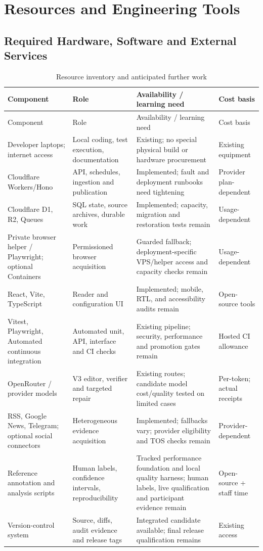 \chapter{Resources and Engineering Tools}\label{app:resources}
\section{Required Hardware, Software and External Services}
\begin{longtable}{L{3.35cm}L{3cm}L{3.7cm}L{2.25cm}}
\caption{Resource inventory and anticipated further work}\label{tab:resources}\\\toprule Component & Role & Availability / learning need & Cost basis \\ \midrule\endfirsthead\toprule Component & Role & Availability / learning need & Cost basis \\ \midrule\endhead
Developer laptops; internet access & Local coding, test execution, documentation & Existing; no special physical build or hardware procurement & Existing equipment \\
Cloudflare Workers/Hono & API, schedules, ingestion and publication & Implemented; fault and deployment runbooks need tightening & Provider plan-dependent \\
Cloudflare D1, R2, Queues & SQL state, source archives, durable work & Implemented; capacity, migration and restoration tests remain & Usage-dependent \\
Private browser helper / Playwright; optional Containers & Permissioned browser acquisition & Guarded fallback; deployment-specific VPS/helper access and capacity checks remain & Usage-dependent \\
React, Vite, TypeScript & Reader and configuration UI & Implemented; mobile, RTL, and accessibility audits remain & Open-source tools \\
Vitest, Playwright, Automated continuous integration & Automated unit, API, interface and CI checks & Existing pipeline; security, performance and promotion gates remain & Hosted CI allowance \\
OpenRouter / provider models & V3 editor, verifier and targeted repair & Existing routes; candidate model cost/quality tested on limited cases & Per-token; actual receipts \\
RSS, Google News, Telegram; optional social connectors & Heterogeneous evidence acquisition & Implemented; fallbacks vary; provider eligibility and TOS checks remain & Provider-dependent \\
Reference annotation and analysis scripts & Human labels, confidence intervals, reproducibility & Tracked performance foundation and local quality harness; human labels, live qualification and participant evidence remain & Open-source + staff time \\
Version-control system & Source, diffs, audit evidence and release tags & Integrated candidate available; final release qualification remains & Existing access \\
\bottomrule\end{longtable}

